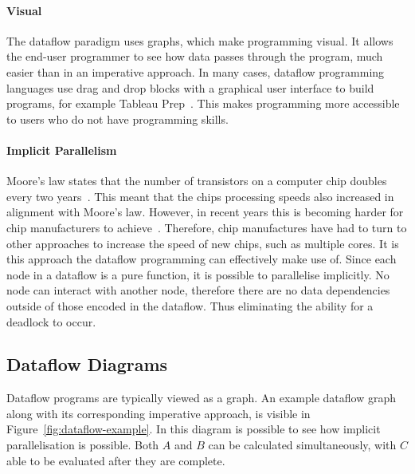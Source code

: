 \documentclass[
author={Riley Evans},
supervisor={Dr. Meng Wang},
degree={MEng},
title={\vbox{Circuit: A Domain Specific Language for Dataflow Programming}},
subtitle={},
type={research},
year={2021}
]{dissertation}
\begin{document}
\paragraph{Visual}
The dataflow paradigm uses graphs, which make programming visual.
It allows the end-user programmer to see how data passes through the program, much easier than in an imperative approach.
In many cases, dataflow programming languages use drag and drop blocks with a graphical user interface to build programs,
for example Tableau Prep~\cite{tableauPrep}.
This makes programming more accessible to users who do not have programming skills.

\paragraph{Implicit Parallelism}
Moore's law states that the number of transistors on a computer chip doubles every two years~\cite{4785860}.
This meant that the chips processing speeds also increased in alignment with Moore's law.
However, in recent years this is becoming harder for chip manufacturers to achieve~\cite{bentley_2020}.
Therefore, chip manufactures have had to turn to other approaches to increase the speed of new chips, such as multiple cores.
It is this approach the dataflow programming can effectively make use of.
Since each node in a dataflow is a pure function, it is possible to parallelise implicitly.
No node can interact with another node, therefore there are no data dependencies outside of those encoded in the dataflow.
Thus eliminating the ability for a deadlock to occur.

\subsection{Dataflow Diagrams}
Dataflow programs are typically viewed as a graph.
An example dataflow graph along with its corresponding imperative approach, is visible in Figure~\ref{fig:dataflow-example}.
In this diagram is possible to see how implicit parallelisation is possible.
Both $A$ and $B$ can be calculated simultaneously, with $C$ able to be evaluated after they are complete.
\end{document}
